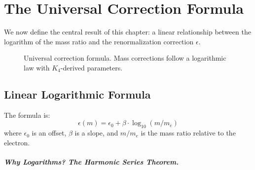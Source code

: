 \documentclass[11pt,a4paper]{book}
\begin{document}
\chapter{The Universal Correction Formula}
\label{chap:universal-correction}

We now define the central result of this chapter: a linear relationship between the logarithm of the mass ratio and the renormalization correction $\epsilon$.

\begin{figure}[h]
\centering
{}
\caption{Universal correction formula. Mass corrections follow a logarithmic law with $K_4$-derived parameters.}
\label{fig:universal-correction}
\end{figure}

\section{Linear Logarithmic Formula}

The formula is:
\[
\epsilon(m) = \epsilon_0 + \beta \cdot \log_{10}(m / m_e)
\]
where $\epsilon_0$ is an offset, $\beta$ is a slope, and $m / m_e$ is the mass ratio relative to the electron.

\paragraph{Why Logarithms? The Harmonic Series Theorem.}
\end{document}
